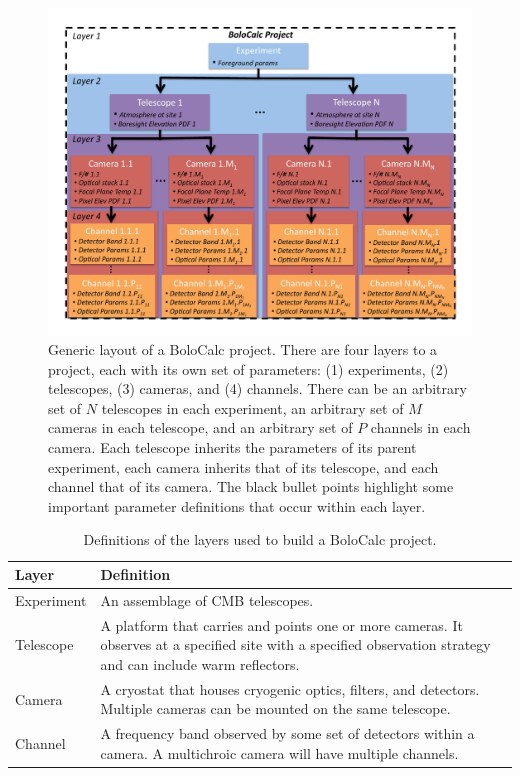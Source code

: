 \begin{figure}[ht!]
    \centering
    \includegraphics[width=0.98\linewidth]{BoloCalc/Figures/OrgDiagram.pdf}
    \caption[Generic layout of a BoloCalc project]{Generic layout of a BoloCalc project. There are four layers to a project, each with its own set of parameters: (1) experiments, (2) telescopes, (3) cameras, and (4) channels.  There can be an arbitrary set of $N$ telescopes in each experiment, an arbitrary set of $M$ cameras in each telescope, and an arbitrary set of $P$ channels in each camera. Each telescope inherits the parameters of its parent experiment, each camera inherits that of its telescope, and each channel that of its camera. The black bullet points highlight some important parameter definitions that occur within each layer.}
    \label{fig:bolocalc_layout}
\end{figure}

\begin{table}[!ht]
	\centering
    \tabulinesep=0.8mm
	\begin{tabu}[t]{|| l | p{13cm} ||}
    \hline
    \textbf{Layer} & \textbf{Definition} \\
    \hline
    \hline
    Experiment & An assemblage of CMB telescopes. \\
    \hline
    Telescope & A platform that carries and points one or more cameras. It observes at a specified site with a specified observation strategy and can include warm reflectors. \\
    \hline
    Camera & A cryostat that houses cryogenic optics, filters, and detectors. Multiple cameras can be mounted on the same telescope. \\
    \hline
    Channel & A frequency band observed by some set of detectors within a camera. A multichroic camera will have multiple channels. \\
    \hline
    \end{tabu}
    \caption{Definitions of the layers used to build a BoloCalc project.  \label{tab:bolocalc_layers}} 
\end{table}

